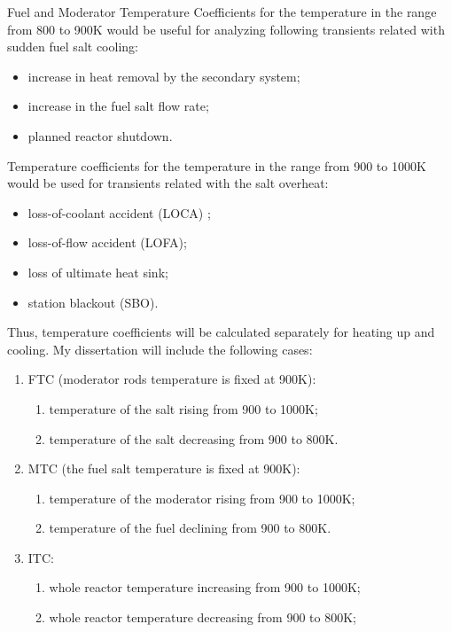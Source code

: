 Fuel and Moderator Temperature Coefficients for the temperature in the range 
from 800 to 900K would be useful for analyzing following transients related 
with sudden fuel salt cooling: 
\begin{itemize}
	\item increase in heat removal by the secondary system;
	\item increase in the fuel salt flow rate;
	\item planned reactor shutdown.
\end{itemize}
Temperature coefficients for the temperature in the range from 900 to 1000K 
would be used for transients related with the salt overheat: 
\begin{itemize}
	\item loss-of-coolant accident (LOCA) ;
	\item loss-of-flow accident (LOFA);
	\item loss of ultimate heat sink;
	\item  station blackout (SBO).
\end{itemize}
Thus, temperature coefficients will be calculated separately for heating up 
and cooling. My dissertation will include the following cases: 
\begin{enumerate}
	\item FTC (moderator rods temperature is fixed at 900K):
		\begin{enumerate}[label=(\alph*)]
			\item temperature of the salt rising from 900 to 1000K;
			\item temperature of the salt decreasing from 900 to 800K.
		\end{enumerate}
	\item MTC (the fuel salt temperature is fixed at 900K): 
		\begin{enumerate}[label=(\alph*)]
			\item temperature of the moderator rising from 900 to 1000K;
			\item temperature of the fuel declining from 900 to 800K.
		\end{enumerate}
	\item ITC: 
		\begin{enumerate}[label=(\alph*)]
			\item whole reactor temperature increasing from 900 to 1000K;
			\item whole reactor temperature decreasing from 900 to 800K;
		\end{enumerate}
\end{enumerate}
